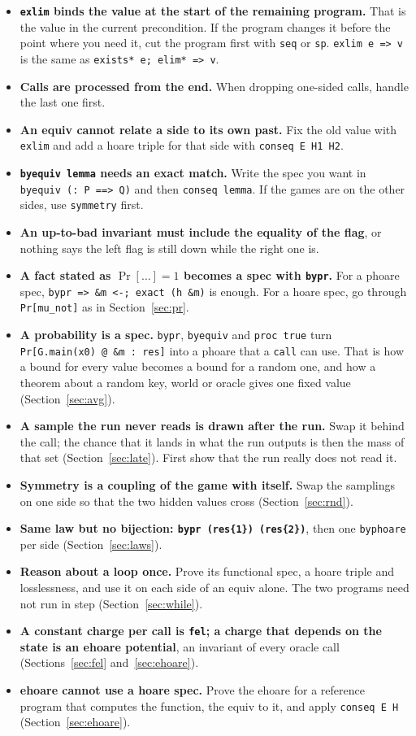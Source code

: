 \documentclass[10pt,a4paper]{article}
\newcommand{\ec}{\lstinline[basicstyle=\small\ttfamily]}
\begin{document}
\begin{itemize}
  \item \textbf{\ec|exlim| binds the value at the start of the remaining program.}
    That is the value in the current precondition.
    If the program changes it before the point where you need it, cut the program first with \ec|seq| or \ec|sp|.
    \ec|exlim e => v| is the same as \ec|exists* e; elim* => v|.
  \item \textbf{Calls are processed from the end.}
    When dropping one-sided calls, handle the last one first.
  \item \textbf{An equiv cannot relate a side to its own past.}
    Fix the old value with \ec|exlim| and add a hoare triple for that side with \ec|conseq E H1 H2|.
  \item \textbf{\ec|byequiv lemma| needs an exact match.}
    Write the spec you want in \ec|byequiv (: P ==> Q)| and then \ec|conseq lemma|.
    If the games are on the other sides, use \ec|symmetry| first.
  \item \textbf{An up-to-bad invariant must include the equality of the flag}, or nothing says the left flag is still down while the right one is.
  \item \textbf{A fact stated as $\Pr[\dots] = 1$ becomes a spec with \ec|bypr|.}
    For a phoare spec, \ec|bypr => &m <-; exact (h &m)| is enough.
    For a hoare spec, go through \ec|Pr[mu_not]| as in Section~\ref{sec:pr}.
  \item \textbf{A probability is a spec.}
    \ec|bypr|, \ec|byequiv| and \ec|proc true| turn \ec|Pr[G.main(x0) @ &m : res]| into a phoare that a \ec|call| can use.
    That is how a bound for every value becomes a bound for a random one, and how a theorem about a random key, world or oracle gives one fixed value (Section~\ref{sec:avg}).
  \item \textbf{A sample the run never reads is drawn after the run.}
    Swap it behind the call; the chance that it lands in what the run outputs is then the mass of that set (Section~\ref{sec:late}).
    First show that the run really does not read it.
  \item \textbf{Symmetry is a coupling of the game with itself.}
    Swap the samplings on one side so that the two hidden values cross (Section~\ref{sec:rnd}).
  \item \textbf{Same law but no bijection: \ec|bypr (res{1}) (res{2})|}, then one \ec|byphoare| per side (Section~\ref{sec:laws}).
  \item \textbf{Reason about a loop once.}
    Prove its functional spec, a hoare triple and losslessness, and use it on each side of an equiv alone.
    The two programs need not run in step (Section~\ref{sec:while}).
  \item \textbf{A constant charge per call is \ec|fel|; a charge that depends on the state is an ehoare potential}, an invariant of every oracle call (Sections~\ref{sec:fel} and~\ref{sec:ehoare}).
  \item \textbf{ehoare cannot use a hoare spec.}
    Prove the ehoare for a reference program that computes the function, the equiv to it, and apply \ec|conseq E H| (Section~\ref{sec:ehoare}).
\end{itemize}
\end{document}
